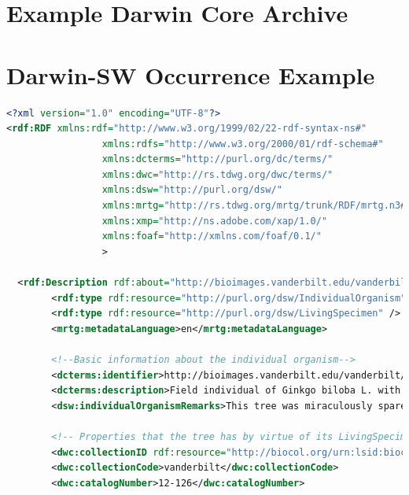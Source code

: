 \begin{appendices}
\chapter{Example Darwin Core Archive}\label{appendix:dwc}





\chapter{Darwin-SW Occurrence Example}\label{appendix:dsw}
\begin{lstlisting}[language=XML, caption={Darwin-SW Representation of a Living Specimen}]
<?xml version="1.0" encoding="UTF-8"?>
<rdf:RDF xmlns:rdf="http://www.w3.org/1999/02/22-rdf-syntax-ns#"
                 xmlns:rdfs="http://www.w3.org/2000/01/rdf-schema#"
                 xmlns:dcterms="http://purl.org/dc/terms/"
                 xmlns:dwc="http://rs.tdwg.org/dwc/terms/"
                 xmlns:dsw="http://purl.org/dsw/"
                 xmlns:mrtg="http://rs.tdwg.org/mrtg/trunk/RDF/mrtg.n3#"
                 xmlns:xmp="http://ns.adobe.com/xap/1.0/"
                 xmlns:foaf="http://xmlns.com/foaf/0.1/"
                 >

  <rdf:Description rdf:about="http://bioimages.vanderbilt.edu/vanderbilt/12-126">
        <rdf:type rdf:resource="http://purl.org/dsw/IndividualOrganism" />
        <rdf:type rdf:resource="http://purl.org/dsw/LivingSpecimen" />
        <mrtg:metadataLanguage>en</mrtg:metadataLanguage>

        <!--Basic information about the individual organism-->
        <dcterms:identifier>http://bioimages.vanderbilt.edu/vanderbilt/12-126</dcterms:identifier>
        <dcterms:description>Field individual of Ginkgo biloba L. with GUID: http://bioimages.vanderbilt.edu/vanderbilt/12-126</dcterms:description>
        <dsw:individualOrganismRemarks>This tree was miraculously spared from destruction in the building of the 21st Ave. crosswalk.</dsw:individualOrganismRemarks>

        <!-- Properties that the tree has by virtue of its LivingSpecimen type -->
        <dwc:collectionID rdf:resource="http://biocol.org/urn:lsid:biocol.org:col:35259" />
        <dwc:collectionCode>vanderbilt</dwc:collectionCode>
        <dwc:catalogNumber>12-126</dwc:catalogNumber>


\end{lstlisting}
\end{appendices}
